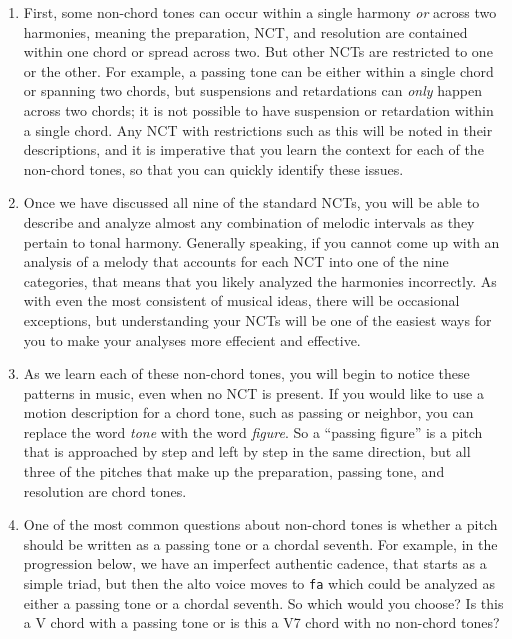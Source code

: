 \documentclass{book}
\providecommand{\tightlist}{%
  \setlength{\itemsep}{0pt}\setlength{\parskip}{0pt}}
\begin{document}
\begin{enumerate}
\def\labelenumi{\arabic{enumi}.}
\tightlist
\item
  First, some non-chord tones can occur within a single harmony \emph{or}
  across two harmonies, meaning the preparation, NCT, and resolution are
  contained within one chord or spread across two. But other NCTs are
  restricted to one or the other. For example, a passing tone can be either
  within a single chord or spanning two chords, but suspensions and
  retardations can \emph{only} happen across two chords; it is not possible to
  have suspension or retardation within a single chord. Any NCT with
  restrictions such as this will be noted in their descriptions, and it is
  imperative that you learn the context for each of the non-chord tones, so
  that you can quickly identify these issues.
\item
  Once we have discussed all nine of the standard NCTs, you will be able to
  describe and analyze almost any combination of melodic intervals as they
  pertain to tonal harmony. Generally speaking, if you cannot come up with an
  analysis of a melody that accounts for each NCT into one of the nine
  categories, that means that you likely analyzed the harmonies incorrectly.
  As with even the most consistent of musical ideas, there will be occasional
  exceptions, but understanding your NCTs will be one of the easiest ways for
  you to make your analyses more effecient and effective.
\item
  As we learn each of these non-chord tones, you will begin to notice these
  patterns in music, even when no NCT is present. If you would like to use a
  motion description for a chord tone, such as passing or neighbor, you can
  replace the word \emph{tone} with the word \emph{figure}. So a ``passing
  figure'' is a pitch that is approached by step and left by step in the same
  direction, but all three of the pitches that make up the preparation,
  passing tone, and resolution are chord tones.
\item
  One of the most common questions about non-chord tones is whether a pitch
  should be written as a passing tone or a chordal seventh. For example, in
  the progression below, we have an imperfect authentic cadence, that starts
  as a simple triad, but then the alto voice moves to \texttt{fa} which could
  be analyzed as either a passing tone or a chordal seventh. So which would
  you choose? Is this a V chord with a passing tone or is this a V7 chord with
  no non-chord tones?
\end{enumerate}
\end{document}

